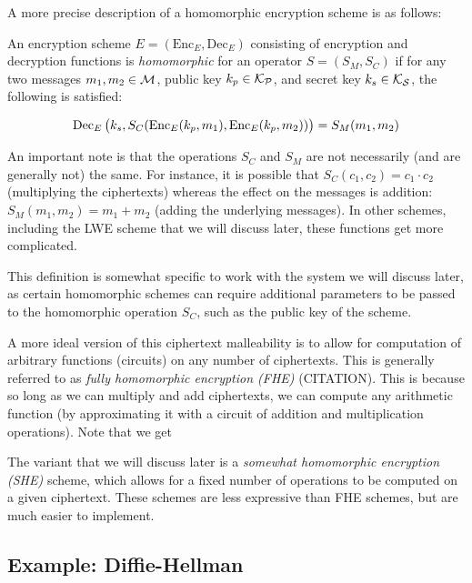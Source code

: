 \documentclass{theme}
\newcommand{\Enc}{\text{Enc}}
\newcommand{\Dec}{\text{Dec}}
\begin{document}
A more precise description of a homomorphic encryption scheme is as follows:

\begin{ndefinition}
    An encryption scheme $E = (\Enc_E, \Dec_E)$ consisting of encryption and decryption functions is \textit{homomorphic} for an operator $S = (S_M, S_C)$ if for any two messages $m_1, m_2 \in \mathcal{M}$, public key $k_p \in \mathcal{K_P}$, and secret key $k_s \in \mathcal{K_S}$, the following is satisfied:

    \begin{equation}
        \Dec_E\p{k_s, S_C(\Enc_E(k_p, m_1), \Enc_E(k_p, m_2))} = S_M(m_1, m_2)
    \end{equation}
\end{ndefinition}

An important note is that the operations $S_C$ and $S_M$ are not necessarily (and are generally not) the same. For instance, it is possible that $S_C(c_1, c_2) = c_1 \cdot c_2$ (multiplying the ciphertexts) whereas the effect on the messages is addition: $S_M(m_1, m_2) = m_1 + m_2$ (adding the underlying messages). In other schemes, including the LWE scheme that we will discuss later, these functions get more complicated.

This definition is somewhat specific to work with the system we will discuss later, as certain homomorphic schemes can require additional parameters to be passed to the homomorphic operation $S_C$, such as the public key of the scheme.

A more ideal version of this ciphertext malleability is to allow for computation of arbitrary functions (circuits) on any number of ciphertexts. This is generally referred to as \textit{fully homomorphic encryption (FHE)} (CITATION). This is because so long as we can multiply and add ciphertexts, we can compute any arithmetic function (by approximating it with a circuit of addition and multiplication operations). Note that we get

The variant that we will discuss later is a \textit{somewhat homomorphic encryption (SHE)} scheme, which allows for a fixed number of operations to be computed on a given ciphertext. These schemes are less expressive than FHE schemes, but are much easier to implement.

\subsection{Example: Diffie-Hellman}
\end{document}
